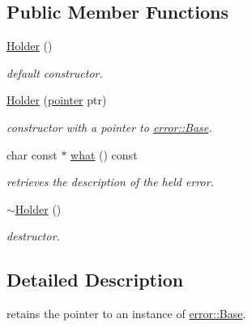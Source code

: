 \subsection*{Public Member Functions}
\begin{DoxyCompactItemize}
\item 
\hyperlink{classhryky_1_1error_1_1_holder_a6ca38bfd85f20a356fbbb502f5014a61}{Holder} ()
\begin{DoxyCompactList}\small\item\em default constructor. \end{DoxyCompactList}\item 
\hypertarget{classhryky_1_1error_1_1_holder_afe3ac23d03c6cf27a484e04f47e4c563}{\hyperlink{classhryky_1_1error_1_1_holder_afe3ac23d03c6cf27a484e04f47e4c563}{Holder} (\hyperlink{classhryky_1_1error_1_1_base}{pointer} ptr)}\label{classhryky_1_1error_1_1_holder_afe3ac23d03c6cf27a484e04f47e4c563}

\begin{DoxyCompactList}\small\item\em constructor with a pointer to \hyperlink{classhryky_1_1error_1_1_base}{error\-::\-Base}. \end{DoxyCompactList}\item 
\hypertarget{classhryky_1_1error_1_1_holder_a2b2d9a132be02b1e55fdb157ed73cb2f}{char const $\ast$ \hyperlink{classhryky_1_1error_1_1_holder_a2b2d9a132be02b1e55fdb157ed73cb2f}{what} () const }\label{classhryky_1_1error_1_1_holder_a2b2d9a132be02b1e55fdb157ed73cb2f}

\begin{DoxyCompactList}\small\item\em retrieves the description of the held error. \end{DoxyCompactList}\item 
\hypertarget{classhryky_1_1error_1_1_holder_af320e8f0a727858f4171c14b14e82cc0}{\hyperlink{classhryky_1_1error_1_1_holder_af320e8f0a727858f4171c14b14e82cc0}{$\sim$\-Holder} ()}\label{classhryky_1_1error_1_1_holder_af320e8f0a727858f4171c14b14e82cc0}

\begin{DoxyCompactList}\small\item\em destructor. \end{DoxyCompactList}\end{DoxyCompactItemize}


\subsection{Detailed Description}
retains the pointer to an instance of \hyperlink{classhryky_1_1error_1_1_base}{error\-::\-Base}. 

